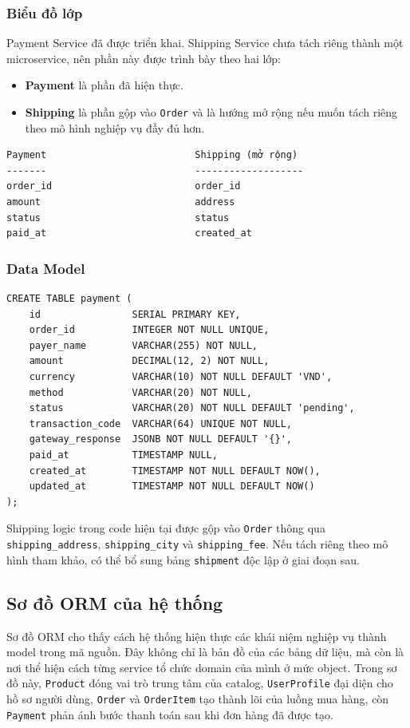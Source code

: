 \documentclass[12pt,a4paper]{article}
\begin{document}
\subsubsection{Biểu đồ lớp}
Payment Service đã được triển khai. Shipping Service chưa tách riêng thành một microservice, nên phần này được trình bày theo hai lớp:
\begin{itemize}
  \item \textbf{Payment} là phần đã hiện thực.
  \item \textbf{Shipping} là phần gộp vào \texttt{Order} và là hướng mở rộng nếu muốn tách riêng theo mô hình nghiệp vụ đầy đủ hơn.
\end{itemize}

\begin{lstlisting}[style=code,caption={Mô hình logic Payment và Shipping}]
Payment                          Shipping (mở rộng)
-------                          -------------------
order_id                         order_id
amount                           address
status                           status
paid_at                          created_at
\end{lstlisting}

\subsubsection{Data Model}
\begin{lstlisting}[style=code,caption={Data model rút gọn của Payment Service}]
CREATE TABLE payment (
    id                SERIAL PRIMARY KEY,
    order_id          INTEGER NOT NULL UNIQUE,
    payer_name        VARCHAR(255) NOT NULL,
    amount            DECIMAL(12, 2) NOT NULL,
    currency          VARCHAR(10) NOT NULL DEFAULT 'VND',
    method            VARCHAR(20) NOT NULL,
    status            VARCHAR(20) NOT NULL DEFAULT 'pending',
    transaction_code  VARCHAR(64) UNIQUE NOT NULL,
    gateway_response  JSONB NOT NULL DEFAULT '{}',
    paid_at           TIMESTAMP NULL,
    created_at        TIMESTAMP NOT NULL DEFAULT NOW(),
    updated_at        TIMESTAMP NOT NULL DEFAULT NOW()
);
\end{lstlisting}

Shipping logic trong code hiện tại được gộp vào \texttt{Order} thông qua \texttt{shipping\_address}, \texttt{shipping\_city} và \texttt{shipping\_fee}. Nếu tách riêng theo mô hình tham khảo, có thể bổ sung bảng \texttt{shipment} độc lập ở giai đoạn sau.

\subsection{Sơ đồ ORM của hệ thống}
Sơ đồ ORM cho thấy cách hệ thống hiện thực các khái niệm nghiệp vụ thành model trong mã nguồn. Đây không chỉ là bản đồ của các bảng dữ liệu, mà còn là nơi thể hiện cách từng service tổ chức domain của mình ở mức object. Trong sơ đồ này, \texttt{Product} đóng vai trò trung tâm của catalog, \texttt{UserProfile} đại diện cho hồ sơ người dùng, \texttt{Order} và \texttt{OrderItem} tạo thành lõi của luồng mua hàng, còn \texttt{Payment} phản ánh bước thanh toán sau khi đơn hàng đã được tạo.
\end{document}
